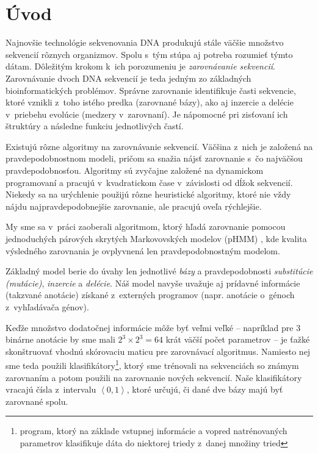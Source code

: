 \chapter*{Úvod}
{}

Najnovšie technológie sekvenovania DNA produkujú stále väčšie množstvo sekvencií rôznych organizmov. Spolu s~tým stúpa aj potreba rozumieť týmto dátam.
Dôležitým krokom k~ich porozumeniu je \textit{zarovnávanie sekvencií}.
Zarovnávanie dvoch DNA sekvencií je teda jedným zo základných
bioinformatických problémov. Správne zarovnanie identifikuje časti
sekvencie, ktoré vznikli z~toho istého predka (zarovnané bázy), ako aj
inzercie a delécie v~priebehu evolúcie (medzery v~zarovnaní).
Je nápomocné pri zisťovaní ich štruktúry a následne funkciu jednotlivých častí.

Existujú rôzne algoritmy na zarovnávanie sekvencií. Väčšina z~nich je založená na  pravdepodobnostnom modeli, pričom sa snažia nájsť zarovnanie s~čo najväčšou pravdepodobnosťou.
Algoritmy sú zvyčajne založené na dynamickom programovaní a pracujú v~kvadratickom čase v~závislosti od dĺžok sekvencií. Niekedy sa na urýchlenie použijú rôzne heuristické algoritmy, ktoré nie vždy nájdu najpravdepodobnejšie zarovnanie, ale pracujú oveľa rýchlejšie.

My sme sa v~práci zaoberali algoritmom, ktorý hľadá zarovnanie pomocou jednoduchých párových skrytých
Markovovských modelov (pHMM) \cite{durbin}, kde kvalita výsledného zarovnania je ovplyvnená len pravdepodobnostným modelom.

Základný model berie do úvahy len jednotlivé \textit{bázy} a pravdepodobnosti \textit{substitúcie (mutácie)}, \textit{inzercie} a \textit{delécie}.
Náš model navyše uvažuje aj prídavné informácie (takzvané anotácie) získané z~externých programov (napr. anotácie o~génoch z~vyhľadávača génov).

Keďže množstvo dodatočnej informácie môže byť veľmi veľké -- napríklad pre 3 binárne anotácie by sme mali $2^3 \times 2^3 = 64$ krát väčší počet parametrov --
je ťažké skonštruovať vhodnú skórovaciu maticu pre zarovnávací algoritmus.
Namiesto nej sme teda použili klasifikátory\footnote{program, ktorý na základe vstupnej informácie a vopred natrénovaných parametrov klasifikuje dáta do niektorej triedy z~danej množiny tried}, ktorý  sme trénovali na sekvenciách so známym zarovnaním a potom použili na zarovnanie nových sekvencií. Naše klasifikátory vracajú čísla z~intervalu $\left<0, 1\right>$, ktoré určujú, či dané dve bázy majú byť zarovnané spolu.

